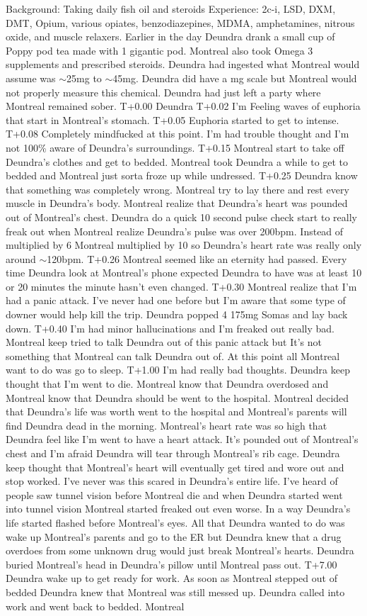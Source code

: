 \documentclass[12pt]{book}
\begin{document}
Background: Taking daily fish oil and steroids Experience: 2c-i, LSD, DXM, DMT, Opium, various opiates, benzodiazepines, MDMA, amphetamines, nitrous oxide, and muscle relaxers. Earlier in the day Deundra drank a small cup of Poppy pod tea made with 1 gigantic pod. Montreal also took Omega 3 supplements and prescribed steroids. Deundra had ingested what Montreal would assume was $\sim$25mg to $\sim$45mg. Deundra did have a mg scale but Montreal would not properly measure this chemical. Deundra had just left a party where Montreal remained sober. T+0.00 Deundra T+0.02 I'm Feeling waves of euphoria that start in Montreal's stomach. T+0.05 Euphoria started to get to intense. T+0.08 Completely mindfucked at this point. I'm had trouble thought and I'm not 100\% aware of Deundra's surroundings. T+0.15 Montreal start to take off Deundra's clothes and get to bedded. Montreal took Deundra a while to get to bedded and Montreal just sorta froze up while undressed. T+0.25 Deundra know that something was completely wrong. Montreal try to lay there and rest every muscle in Deundra's body. Montreal realize that Deundra's heart was pounded out of Montreal's chest. Deundra do a quick 10 second pulse check start to really freak out when Montreal realize Deundra's pulse was over 200bpm. Instead of multiplied by 6 Montreal multiplied by 10 so Deundra's heart rate was really only around $\sim$120bpm. T+0.26 Montreal seemed like an eternity had passed. Every time Deundra look at Montreal's phone expected Deundra to have was at least 10 or 20 minutes the minute hasn't even changed. T+0.30 Montreal realize that I'm had a panic attack. I've never had one before but I'm aware that some type of downer would help kill the trip. Deundra popped 4 175mg Somas and lay back down. T+0.40 I'm had minor hallucinations and I'm freaked out really bad. Montreal keep tried to talk Deundra out of this panic attack but It's not something that Montreal can talk Deundra out of. At this point all Montreal want to do was go to sleep. T+1.00 I'm had really bad thoughts. Deundra keep thought that I'm went to die. Montreal know that Deundra overdosed and Montreal know that Deundra should be went to the hospital. Montreal decided that Deundra's life was worth went to the hospital and Montreal's parents will find Deundra dead in the morning. Montreal's heart rate was so high that Deundra feel like I'm went to have a heart attack. It's pounded out of Montreal's chest and I'm afraid Deundra will tear through Montreal's rib cage. Deundra keep thought that Montreal's heart will eventually get tired and wore out and stop worked. I've never was this scared in Deundra's entire life. I've heard of people saw tunnel vision before Montreal die and when Deundra started went into tunnel vision Montreal started freaked out even worse. In a way Deundra's life started flashed before Montreal's eyes. All that Deundra wanted to do was wake up Montreal's parents and go to the ER but Deundra knew that a drug overdoes from some unknown drug would just break Montreal's hearts. Deundra buried Montreal's head in Deundra's pillow until Montreal pass out. T+7.00 Deundra wake up to get ready for work. As soon as Montreal stepped out of bedded Deundra knew that Montreal was still messed up. Deundra called into work and went back to bedded. Montreal 
\end{document}
